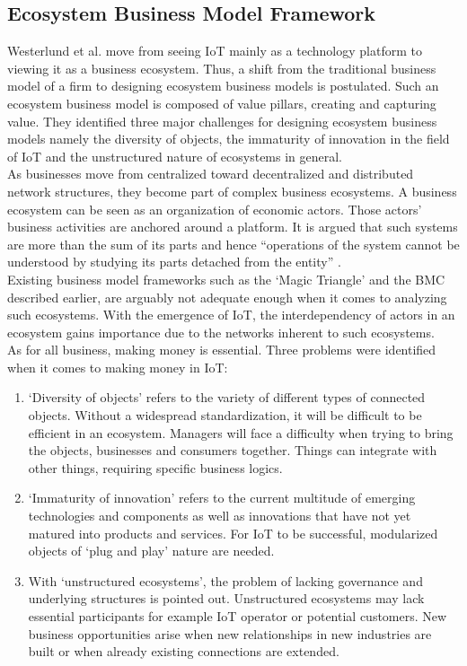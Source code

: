 	\subsection{Ecosystem Business Model Framework}
	\vspace{-1em}
		Westerlund et al. \cite{westerlund} move from seeing IoT mainly as a technology platform to viewing it as a business ecosystem. Thus, a shift from the traditional business model of a firm to designing ecosystem business models is postulated. Such an ecosystem business model is composed of value pillars, creating and capturing value. They identified three major challenges for designing ecosystem business models namely the diversity of objects, the immaturity of innovation in the field of IoT and the unstructured nature of ecosystems in general.\\
		As businesses move from centralized toward decentralized and distributed network structures, they become part of complex business ecosystems. A business ecosystem can be seen as an organization of economic actors. Those actors' business activities are anchored around a platform. It is argued that such systems are more than the sum of its parts and hence ``operations of the system cannot be understood by studying its parts detached from the entity'' \cite{westerlund}.\\
		Existing business model frameworks such as the `Magic Triangle' and the BMC described earlier, are arguably not adequate enough when it comes to analyzing such ecosystems. With the emergence of IoT, the interdependency of actors in an ecosystem gains importance due to the networks inherent to such ecosystems.\\
		As for all business, making money is essential. Three problems were identified when it comes to making money in IoT:\\
		\vspace{-1em}
		\begin{enumerate}
			\item `Diversity of objects' refers to the variety of different types of connected objects. Without a widespread standardization, it will be difficult to be efficient in an ecosystem. Managers will face a difficulty when trying to bring the objects, businesses and consumers together. Things can integrate with other things, requiring specific business logics.

			\item `Immaturity of innovation' refers to the current multitude of emerging technologies and components as well as innovations that have not yet matured into products and services. For IoT to be successful, modularized objects of `plug and play' nature are needed.

			\item With `unstructured ecosystems', the problem of lacking governance and underlying structures is pointed out. Unstructured ecosystems may lack essential participants for example IoT operator or potential customers. New business opportunities arise when new relationships in new industries are built or when already existing connections are extended.
		\end{enumerate}
